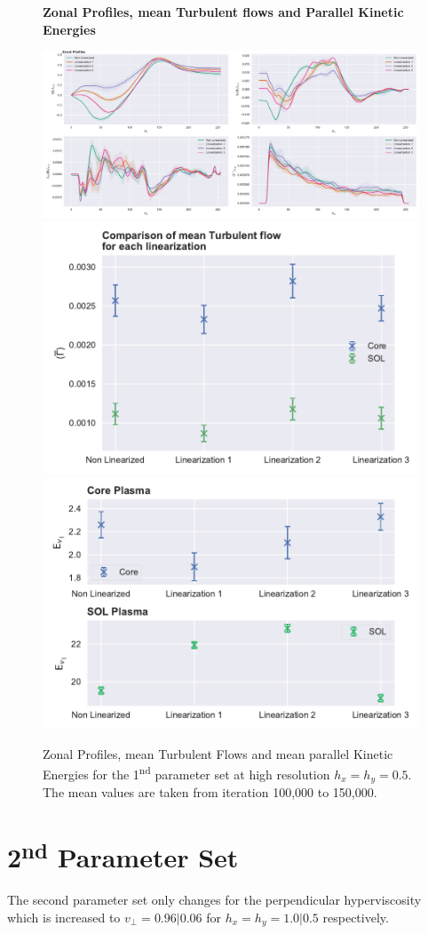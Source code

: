 \documentclass[master.tex]{subfiles}
\begin{document}
\begin{figure}[!hbtp]
    \textbf{Zonal Profiles, mean Turbulent flows and Parallel Kinetic Energies}\par\medskip
    \includegraphics[width=\linewidth]{pdfs/0-2_0-04/zonal-profiles-100000.pdf}
    \includegraphics[width=0.5\linewidth]{pdfs/0-2_0-04/turbulent-flow-means.pdf}
    \includegraphics[width=0.5\linewidth]{pdfs/0-2_0-04/velocity-menas-100000.pdf}
    \caption{Zonal Profiles, mean Turbulent Flows and mean parallel Kinetic Energies for the 1\textsuperscript{nd} parameter set at high resolution $h_x = h_y = 0.5$. The mean values are taken from iteration 100,000 to 150,000.}
    \label{fig:high-resoultion-set-1}
\end{figure}



\section{2\textsuperscript{nd} Parameter Set}
The second parameter set only changes for the perpendicular hyperviscosity which is increased to $v_\perp = 0.96 | 0.06$ for $h_x=h_y=1.0|0.5$ respectively.
\end{document}
